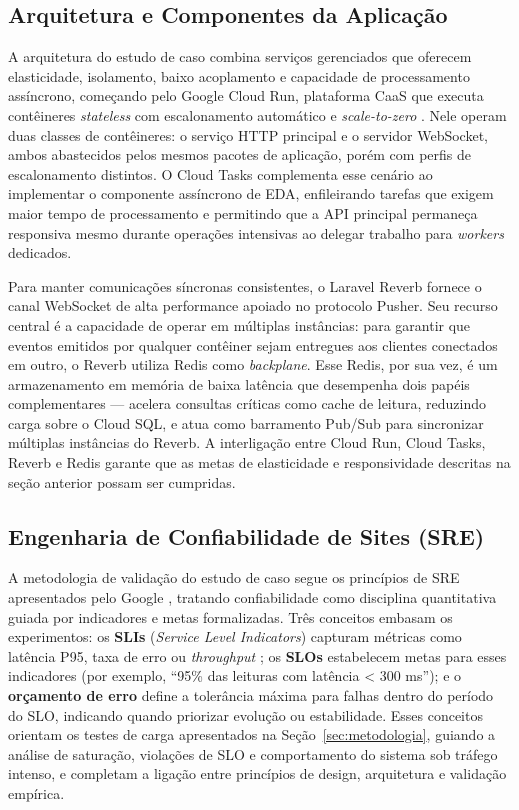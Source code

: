 \subsection{Arquitetura e Componentes da Aplicação}
\label{sec:componentes_app}

A arquitetura do estudo de caso combina serviços gerenciados que oferecem elasticidade,
isolamento, baixo acoplamento e capacidade de processamento assíncrono, começando pelo
Google Cloud Run, plataforma CaaS que executa contêineres \textit{stateless} com escalonamento
automático e \textit{scale-to-zero} \cite{google_elasticity_2024}. Nele operam duas
classes de contêineres: o serviço HTTP principal e o servidor WebSocket,
ambos abastecidos pelos mesmos pacotes de aplicação, porém com perfis de escalonamento distintos.
O Cloud Tasks complementa esse cenário ao implementar o componente assíncrono de EDA,
enfileirando tarefas que exigem maior tempo de processamento e permitindo que a API
principal permaneça responsiva mesmo durante operações intensivas ao delegar trabalho para \textit{workers} dedicados.

Para manter comunicações síncronas consistentes, o Laravel Reverb \cite{laravel_reverb_docs_2025}
fornece o canal WebSocket de alta performance apoiado no protocolo Pusher. Seu recurso central
é a capacidade de operar em múltiplas instâncias: para garantir que eventos emitidos
por qualquer contêiner sejam entregues aos clientes conectados em outro, o Reverb
utiliza Redis como \textit{backplane}. Esse Redis, por sua vez, é um armazenamento
em memória de baixa latência \cite{kleppmann_ddia_2017} que desempenha dois papéis
complementares — acelera consultas críticas como cache de leitura, reduzindo carga
sobre o Cloud SQL, e atua como barramento Pub/Sub para sincronizar múltiplas instâncias
do Reverb. A interligação entre Cloud Run, Cloud Tasks, Reverb e Redis garante que
as metas de elasticidade e responsividade descritas na seção anterior possam ser cumpridas.

\subsection{Engenharia de Confiabilidade de Sites (SRE)}
\label{sec:sre}

A metodologia de validação do estudo de caso segue os princípios de SRE apresentados
pelo Google \cite{google_sre_book_main}, tratando confiabilidade como disciplina
quantitativa guiada por indicadores e metas formalizadas. Três conceitos embasam
os experimentos: os \textbf{SLIs} (\textit{Service Level Indicators}) capturam métricas
como latência P95, taxa de erro ou \textit{throughput} \cite{mccoy_slo_2020};
os \textbf{SLOs} estabelecem metas para esses indicadores (por exemplo, ``95\% das leituras com latência < 300 ms'');
e o \textbf{orçamento de erro} define a tolerância máxima para falhas dentro do período do SLO,
indicando quando priorizar evolução ou estabilidade. Esses conceitos orientam os testes de carga
apresentados na Seção~\ref{sec:metodologia}, guiando a análise de saturação,
violações de SLO e comportamento do sistema sob tráfego intenso, e completam a ligação
entre princípios de design, arquitetura e validação empírica.
